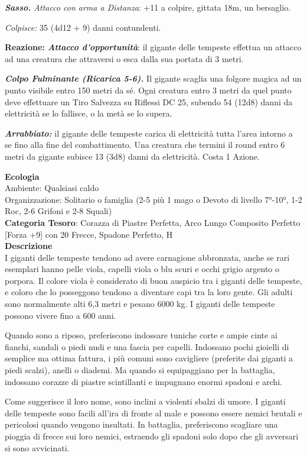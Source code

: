 \begin{multicols}{2}
{\emph{\textbf{Sasso.} Attacco con arma a Distanza}: +11 a colpire, gittata 18m, un bersaglio.

\emph{Colpisce:} 35 (4d12 + 9) danni contundenti.

\textbf{Reazione: \emph{Attacco d'opportunità}}: il gigante delle tempeste effettua un attacco ad una creatura che attraversi o esca dalla sua portata di 3 metri.

\emph{\textbf{Colpo Fulminante (Ricarica 5-6).}} Il gigante scaglia una folgore magica ad un punto visibile entro 150 metri da sé. Ogni creatura entro 3 metri da quel punto deve effettuare un Tiro Salvezza su Riflessi DC 25, subendo 54 (12d8) danni da elettricità se lo fallisce, o la metà se lo supera.

\emph{\textbf{Arrabbiato:}} il gigante delle tempeste carica di elettricità tutta l'area intorno a se fino alla fine del combattimento. Una creatura che termini il round entro 6 metri da gigante subisce 13 (3d8) danni da elettricità. Costa 1 Azione.

\textbf{Ecologia}\\
Ambiente: Qualsiasi caldo\\
Organizzazione: Solitario o famiglia (2-5 più 1 mago o Devoto di livello 7°-10°, 1-2 Roc, 2-6 Grifoni e 2-8 Squali)\\
\textbf{Categoria Tesoro}: Corazza di Piastre Perfetta, Arco Lungo Composito Perfetto [Forza +9] con 20 Frecce, Spadone Perfetto, H\\
\textbf{Descrizione}\\
I giganti delle tempeste tendono ad avere carnagione abbronzata, anche se rari esemplari hanno pelle viola, capelli viola o blu scuri e occhi grigio argento o porpora. Il colore viola è considerato di buon auspicio tra i giganti delle tempeste, e coloro che lo posseggono tendono a diventare capi tra la loro gente. Gli adulti sono normalmente alti 6,3 metri e pesano 6000 kg. I giganti delle tempeste possono vivere fino a 600 anni.

Quando sono a riposo, preferiscono indossare tuniche corte e ampie cinte ai fianchi, sandali o piedi nudi e una fascia per capelli. Indossano pochi gioielli di semplice ma ottima fattura, i più comuni sono cavigliere (preferite dai giganti a piedi scalzi), anelli o diademi. Ma quando si equipaggiano per la battaglia, indossano corazze di piastre scintillanti e impugnano enormi spadoni e archi.

Come suggerisce il loro nome, sono inclini a violenti sbalzi di umore. I giganti delle tempeste sono facili all'ira di fronte al male e possono essere nemici brutali e pericolosi quando vengono insultati. In battaglia, preferiscono scagliare una pioggia di frecce sui loro nemici, estraendo gli spadoni solo dopo che gli avversari si sono avvicinati.

}
\end{multicols}
